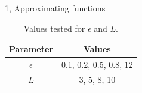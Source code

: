 \documentclass[10pt,a4paper]{article}
\begin{document}
\begin{task}{1, Approximating functions}
\begin{table}[H]
    \centering
    \begin{tabular}{|c|c|}
        \hline
        \textbf{Parameter} & \textbf{Values}\\
        \hline
        $\epsilon$ & 0.1, 0.2, 0.5, 0.8, 12\\
        $L$ & 3, 5, 8, 10\\
        \hline
    \end{tabular}
    \caption{Values tested for $\epsilon$ and $L$.}
    \label{tab:eps-L}
\end{table}

\begin{figure}[H]
    \centering
    \hfill

\end{figure}
\end{task}
\end{document}
